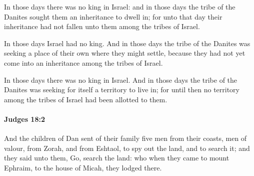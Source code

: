 			\begin{versebox}
					\item[BHS] 
					\item[ASV] In those days there was no king in Israel: and in those days the tribe of the Danites sought them an inheritance to dwell in; for unto that day their inheritance had not fallen unto them among the tribes of Israel.
					\item[NIV] In those days Israel had no king. And in those days the tribe of the Danites was seeking a place of their own where they might settle, because they had not yet come into an inheritance among the tribes of Israel.
					\item[NRSV] In those days there was no king in Israel. And in those days the tribe of the Danites was seeking for itself a territory to live in; for until then no territory among the tribes of Israel had been allotted to them.
			\end{versebox}

		\paragraph{Judges 18:2} %
			\label{JUDGES-18-2}

			And the children of Dan sent of their family five men from their coasts, men of valour, from Zorah, and from Eshtaol, to spy out the land, and to search it; and they said unto them, Go, search the land: who when they came to mount Ephraim, to the house of Micah, they lodged there.

